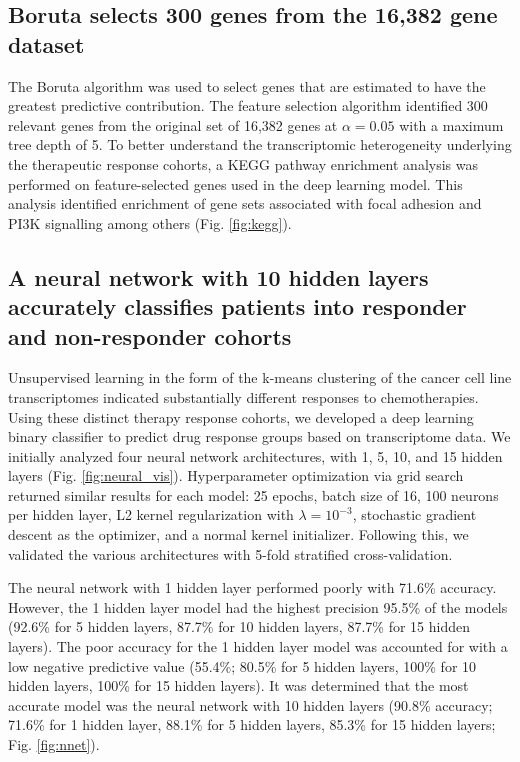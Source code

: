 \documentclass[10pt, letterpaper, twocolumn]{article}
\begin{document}
\subsection{Boruta selects 300 genes from the 16,382 gene dataset}
The Boruta algorithm was used to select genes that are estimated to have the greatest predictive contribution. The feature selection algorithm identified 300 relevant genes from the original set of 16,382 genes at $\alpha=0.05$ with a maximum tree depth of 5. To better understand the transcriptomic heterogeneity underlying the therapeutic response cohorts, a KEGG pathway enrichment analysis was performed on feature-selected genes used in the deep learning model. This analysis identified enrichment of gene sets associated with focal adhesion and PI3K signalling among others (Fig. \ref{fig:kegg}).


\subsection{A neural network with 10 hidden layers accurately classifies patients into responder and non-responder cohorts}
Unsupervised learning in the form of the k-means clustering of the cancer cell line transcriptomes indicated substantially different responses to chemotherapies. Using these distinct therapy response cohorts, we developed a deep learning binary classifier to predict drug response groups based on transcriptome data. We initially analyzed four neural network architectures, with 1, 5, 10, and 15 hidden layers (Fig. \ref{fig:neural_vis}). Hyperparameter optimization via grid search returned similar results for each model: 25 epochs, batch size of 16, 100 neurons per hidden layer, L2 kernel regularization with $\lambda=10^{-3}$, stochastic gradient descent as the optimizer, and a normal kernel initializer. Following this, we validated the various architectures with 5-fold stratified cross-validation.

The neural network with 1 hidden layer performed poorly with 71.6\% accuracy. However, the 1 hidden layer model had the highest precision 95.5\% of the models (92.6\% for 5 hidden layers, 87.7\% for 10 hidden layers, 87.7\% for 15 hidden layers). The poor accuracy for the 1 hidden layer model was accounted for with a low negative predictive value (55.4\%; 80.5\% for 5 hidden layers, 100\% for 10 hidden layers, 100\% for 15 hidden layers). It was determined that the most accurate model was the neural network with 10 hidden layers (90.8\% accuracy; 71.6\% for 1 hidden layer, 88.1\% for 5 hidden layers, 85.3\% for 15 hidden layers; Fig. \ref{fig:nnet}).
\end{document}
